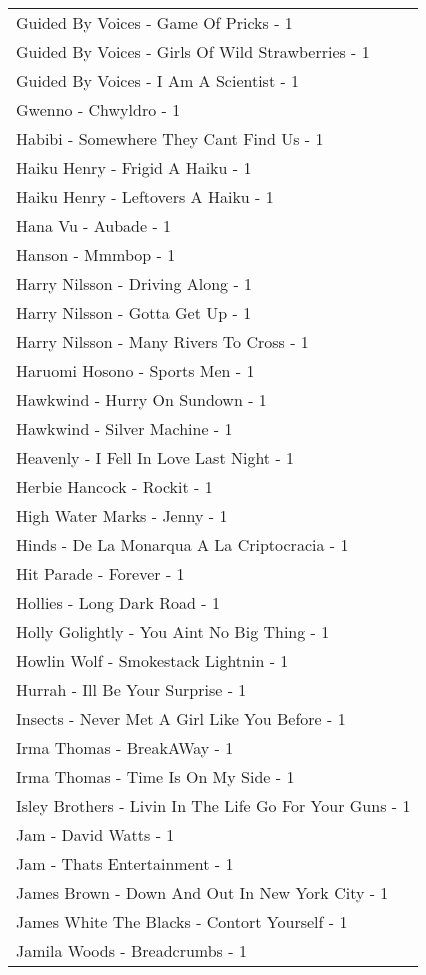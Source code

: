 \documentclass[
]{article}
\begin{document}
\begin{longtable}{l}
Guided By Voices - Game Of Pricks - 1 \\ 
Guided By Voices - Girls Of Wild Strawberries - 1 \\ 
Guided By Voices - I Am A Scientist - 1 \\ 
Gwenno - Chwyldro - 1 \\ 
Habibi - Somewhere They Cant Find Us - 1 \\ 
Haiku Henry - Frigid A Haiku - 1 \\ 
Haiku Henry - Leftovers A Haiku - 1 \\ 
Hana Vu - Aubade - 1 \\ 
Hanson - Mmmbop - 1 \\ 
Harry Nilsson - Driving Along - 1 \\ 
Harry Nilsson - Gotta Get Up - 1 \\ 
Harry Nilsson - Many Rivers To Cross - 1 \\ 
Haruomi Hosono - Sports Men - 1 \\ 
Hawkwind - Hurry On Sundown - 1 \\ 
Hawkwind - Silver Machine - 1 \\ 
Heavenly - I Fell In Love Last Night - 1 \\ 
Herbie Hancock - Rockit - 1 \\ 
High Water Marks - Jenny - 1 \\ 
Hinds - De La Monarqua A La Criptocracia - 1 \\ 
Hit Parade - Forever - 1 \\ 
Hollies - Long Dark Road - 1 \\ 
Holly Golightly - You Aint No Big Thing - 1 \\ 
Howlin Wolf - Smokestack Lightnin - 1 \\ 
Hurrah - Ill Be Your Surprise - 1 \\ 
Insects - Never Met A Girl Like You Before - 1 \\ 
Irma Thomas - BreakAWay - 1 \\ 
Irma Thomas - Time Is On My Side - 1 \\ 
Isley Brothers - Livin In The Life Go For Your Guns - 1 \\ 
Jam - David Watts - 1 \\ 
Jam - Thats Entertainment - 1 \\ 
James Brown - Down And Out In New York City - 1 \\ 
James White The Blacks - Contort Yourself - 1 \\ 
Jamila Woods - Breadcrumbs - 1 \\ 

\end{longtable}
\end{document}
